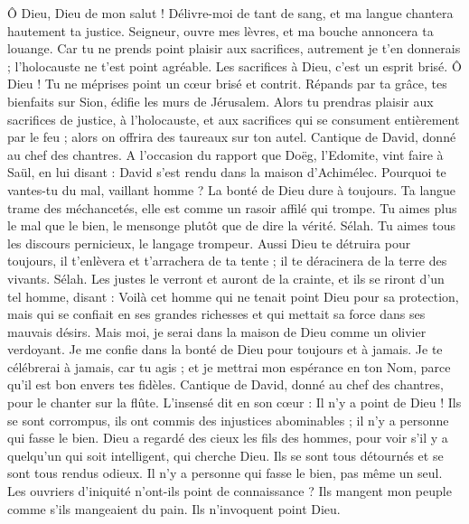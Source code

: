 \begin{multicols}{2}
Ô Dieu, Dieu de mon salut ! Délivre-moi de tant de sang, et ma langue chantera hautement ta justice.
Seigneur, ouvre mes lèvres, et ma bouche annoncera ta louange.
Car tu ne prends point plaisir aux sacrifices, autrement je t'en donnerais ; l'holocauste ne t'est point agréable.
Les sacrifices à Dieu, c'est un esprit brisé. Ô Dieu ! Tu ne méprises point un cœur brisé et contrit.
Répands par ta grâce, tes bienfaits sur Sion, édifie les murs de Jérusalem.
Alors tu prendras plaisir aux sacrifices de justice, à l'holocauste, et aux sacrifices qui se consument entièrement par le feu ; alors on offrira des taureaux sur ton autel.
\VerseOne{}Cantique de David, donné au chef des chantres.
A l'occasion du rapport que Doëg, l'Edomite, vint faire à Saül, en lui disant : David s'est rendu dans la maison d'Achimélec.
Pourquoi te vantes-tu du mal, vaillant homme ? La bonté de Dieu dure à toujours.
Ta langue trame des méchancetés, elle est comme un rasoir affilé qui trompe.
Tu aimes plus le mal que le bien, le mensonge plutôt que de dire la vérité. Sélah.
Tu aimes tous les discours pernicieux, le langage trompeur.
Aussi Dieu te détruira pour toujours, il t'enlèvera et t'arrachera de ta tente ; il te déracinera de la terre des vivants. Sélah.
Les justes le verront et auront de la crainte, et ils se riront d'un tel homme, disant :
Voilà cet homme qui ne tenait point Dieu pour sa protection, mais qui se confiait en ses grandes richesses et qui mettait sa force dans ses mauvais désirs.
Mais moi, je serai dans la maison de Dieu comme un olivier verdoyant. Je me confie dans la bonté de Dieu pour toujours et à jamais.
Je te célébrerai à jamais, car tu agis ; et je mettrai mon espérance en ton Nom, parce qu'il est bon envers tes fidèles.
\VerseOne{}Cantique de David, donné au chef des chantres, pour le chanter sur la flûte.
L'insensé dit en son cœur : Il n'y a point de Dieu ! Ils se sont corrompus, ils ont commis des injustices abominables ; il n'y a personne qui fasse le bien.
Dieu a regardé des cieux les fils des hommes, pour voir s'il y a quelqu'un qui soit intelligent, qui cherche Dieu.
Ils se sont tous détournés et se sont tous rendus odieux. Il n'y a personne qui fasse le bien, pas même un seul.
Les ouvriers d'iniquité n'ont-ils point de connaissance ? Ils mangent mon peuple comme s'ils mangeaient du pain. Ils n'invoquent point Dieu.

\end{multicols}
